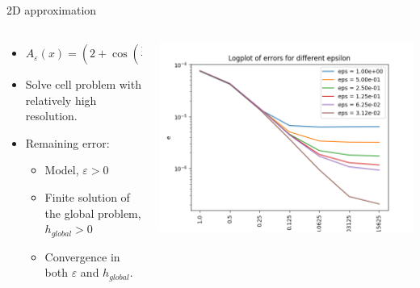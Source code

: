 \documentclass{beamer}
\renewcommand{\epsilon}{\varepsilon}
\begin{document}
\begin{frame}[t]{2D approximation}
  \begin{columns}
    \begin{column}[c]{.6\textwidth}
      \begin{itemize}
        \item
         $ A_\epsilon(x) =  \left( 2+\cos\left(\frac{2\pi(x+2y)}{\epsilon}\right) \right)^{-1}$
       \item Solve cell problem with relatively high resolution.
       \item Remaining error:
      \begin{itemize}
        \item Model, $\epsilon > 0$
        \item Finite solution of the global problem, $h_{global} > 0$
        \item Convergence in both $\epsilon$ and $h_{global}$.
       \end{itemize}
      \end{itemize}
    \end{column}
    \begin{column}[c]{.4\textwidth}
      \includegraphics[width=0.9\linewidth]{2d_global_errors.png}      %
    \end{column}
  \end{columns}

\end{frame}
\end{document}
